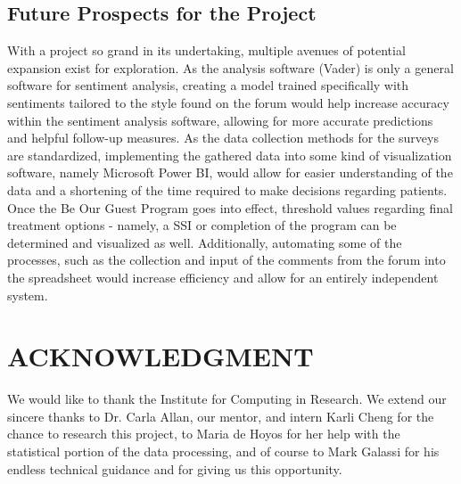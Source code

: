 \documentclass[letterpaper, 12 pt, conference]{ieeeconf}
\begin{document}
\subsection{Future Prospects for the Project}

With a project so grand in its undertaking, multiple avenues of potential expansion exist for exploration. As the analysis software (Vader) is only a general software for sentiment analysis, creating a model trained specifically with sentiments tailored to the style found on the forum would help increase accuracy within the sentiment analysis software, allowing for more accurate predictions and helpful follow-up measures. As the data collection methods for the surveys are standardized, implementing the gathered data into some kind of visualization software, namely Microsoft Power BI, would allow for easier understanding of the data and a shortening of the time required to make decisions regarding patients. Once the Be Our Guest Program goes into effect, threshold values regarding final treatment options - namely, a SSI or completion of the program can be determined and visualized as well. Additionally, automating some of the processes, such as the collection and input of the comments from the forum into the spreadsheet would increase efficiency and allow for an entirely independent system.  



\addtolength{\textheight}{-12cm}   


\section*{ACKNOWLEDGMENT}

We would like to thank the Institute for Computing in Research. We extend our sincere thanks to Dr. Carla Allan, our mentor, and intern Karli Cheng for the chance to research this project, to Maria de Hoyos for her help with the statistical portion of the data processing, and of course to Mark Galassi for his endless technical guidance and for giving us this opportunity.
\end{document}
